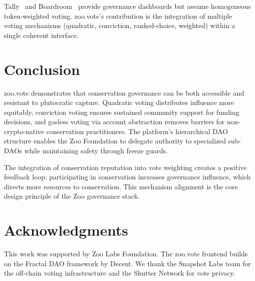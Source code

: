 \documentclass[11pt,letterpaper]{article}
\begin{document}
Tally~\cite{tally2021} and Boardroom~\cite{boardroom2021} provide governance dashboards but assume homogeneous token-weighted voting. zoo.vote's contribution is the integration of multiple voting mechanisms (quadratic, conviction, ranked-choice, weighted) within a single coherent interface.

\section{Conclusion}

zoo.vote demonstrates that conservation governance can be both accessible and resistant to plutocratic capture. Quadratic voting distributes influence more equitably, conviction voting ensures sustained community support for funding decisions, and gasless voting via account abstraction removes barriers for non-crypto-native conservation practitioners. The platform's hierarchical DAO structure enables the Zoo Foundation to delegate authority to specialized sub-DAOs while maintaining safety through freeze guards.

The integration of conservation reputation into vote weighting creates a positive feedback loop: participating in conservation increases governance influence, which directs more resources to conservation. This mechanism alignment is the core design principle of the Zoo governance stack.

\section*{Acknowledgments}

This work was supported by Zoo Labs Foundation. The zoo.vote frontend builds on the Fractal DAO framework by Decent. We thank the Snapshot Labs team for the off-chain voting infrastructure and the Shutter Network for vote privacy.
\end{document}
